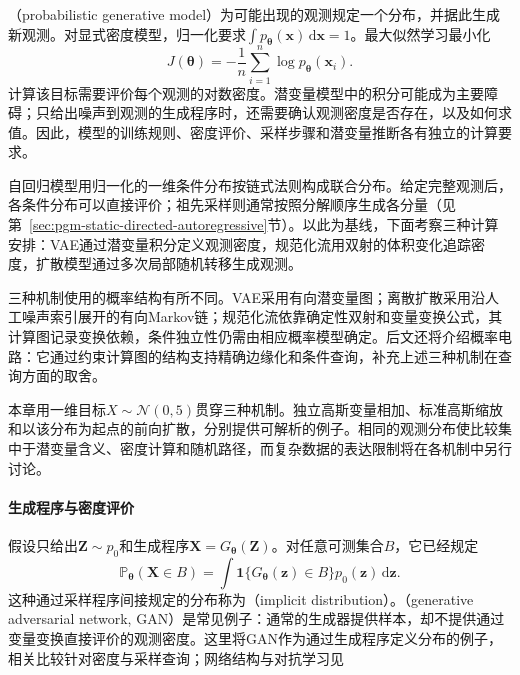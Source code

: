 （probabilistic generative model）为可能出现的观测规定一个分布，并据此生成新观测。对显式密度模型，归一化要求$\int p_{\bm{\theta}}(\bm{x})\,\mathrm{d}\bm{x}=1$。最大似然学习最小化
\begin{equation}
  \label{eq:pgm-generative-nll}
  J(\bm{\theta})
  =-\frac{1}{n}\sum_{i=1}^{n}\log p_{\bm{\theta}}(\bm{x}_i).
\end{equation}
计算该目标需要评价每个观测的对数密度。潜变量模型中的积分可能成为主要障碍；只给出噪声到观测的生成程序时，还需要确认观测密度是否存在，以及如何求值。因此，模型的训练规则、密度评价、采样步骤和潜变量推断各有独立的计算要求。

自回归模型用归一化的一维条件分布按链式法则构成联合分布。给定完整观测后，各条件分布可以直接评价；祖先采样则通常按照分解顺序生成各分量（见第~\ref{sec:pgm-static-directed-autoregressive}节）。以此为基线，下面考察三种计算安排：VAE通过潜变量积分定义观测密度，规范化流用双射的体积变化追踪密度，扩散模型通过多次局部随机转移生成观测。

三种机制使用的概率结构有所不同。VAE采用有向潜变量图；离散扩散采用沿人工噪声索引展开的有向Markov链；规范化流依靠确定性双射和变量变换公式，其计算图记录变换依赖，条件独立性仍需由相应概率模型确定。后文还将介绍概率电路：它通过约束计算图的结构支持精确边缘化和条件查询，补充上述三种机制在查询方面的取舍。

本章用一维目标$X\sim\mathcal{N}(0,5)$贯穿三种机制。独立高斯变量相加、标准高斯缩放和以该分布为起点的前向扩散，分别提供可解析的例子。相同的观测分布使比较集中于潜变量含义、密度计算和随机路径，而复杂数据的表达限制将在各机制中另行讨论。

\paragraph{生成程序与密度评价}
\label{sec:pgm-generative-implicit-boundary}

假设只给出$\bm{Z}\sim p_0$和生成程序$\bm{X}=G_{\bm{\theta}}(\bm{Z})$。对任意可测集合$B$，它已经规定
\begin{equation}
  \label{eq:pgm-generative-pushforward}
  \mathbb{P}_{\bm{\theta}}(\bm{X}\in B)
  =\int \mathbf{1}\{G_{\bm{\theta}}(\bm{z})\in B\}
           p_0(\bm{z})\,\mathrm{d}\bm{z}.
\end{equation}
这种通过采样程序间接规定的分布称为（implicit distribution）。（generative adversarial network, GAN）是常见例子：通常的生成器提供样本，却不提供通过变量变换直接评价的观测密度。这里将GAN作为通过生成程序定义分布的例子，相关比较针对密度与采样查询；网络结构与对抗学习见

